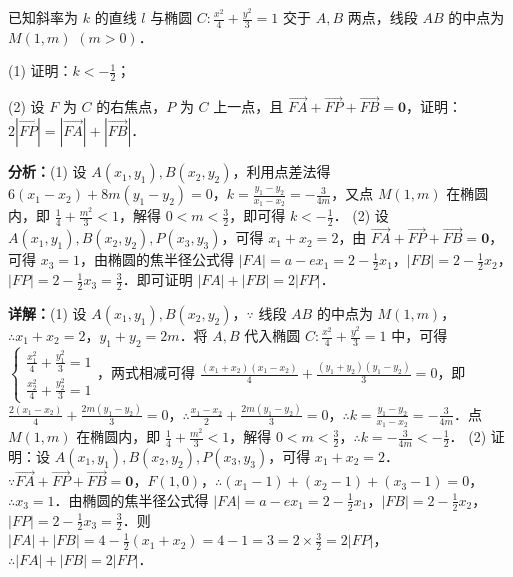 \begin{question}[points=12]
已知斜率为 $k$ 的直线 $l$ 与椭圆 $C: \frac{x^2}{4}+\frac{y^2}{3}=1$ 交于 $A,B$ 两点，线段 $AB$ 的中点为 $M(1,m)$ $(m>0)$．

(1) 证明：$k<-\frac{1}{2}$；

(2) 设 $F$ 为 $C$ 的右焦点，$P$ 为 $C$ 上一点，且 $\overrightarrow{FA}+\overrightarrow{FP}+\overrightarrow{FB}=\boldsymbol{0}$，证明：$2|\overrightarrow{FP}|=|\overrightarrow{FA}|+|\overrightarrow{FB}|$．
\begin{solution}

\textbf{分析：}(1) 设 $A(x_1,y_1),B(x_2,y_2)$，利用点差法得 $6(x_1-x_2)+8m(y_1-y_2)=0$，$k=\frac{y_1-y_2}{x_1-x_2}=-\frac{3}{4m}$，又点 $M(1,m)$ 在椭圆内，即 $\frac{1}{4}+\frac{m^2}{3}<1$，解得 $0<m<\frac{3}{2}$，即可得 $k<-\frac{1}{2}$．
(2) 设 $A(x_1,y_1),B(x_2,y_2),P(x_3,y_3)$，可得 $x_1+x_2=2$，由 $\overrightarrow{FA}+\overrightarrow{FP}+\overrightarrow{FB}=\boldsymbol{0}$，可得 $x_3=1$，由椭圆的焦半径公式得 $|FA|=a-ex_1=2-\frac{1}{2}x_1$，$|FB|=2-\frac{1}{2}x_2$，$|FP|=2-\frac{1}{2}x_3=\frac{3}{2}$．即可证明 $|FA|+|FB|=2|FP|$．

\textbf{详解：}(1) 设 $A(x_1,y_1),B(x_2,y_2)$，$\because$ 线段 $AB$ 的中点为 $M(1,m)$，$\therefore x_1+x_2=2$，$y_1+y_2=2m$．将 $A,B$ 代入椭圆 $C: \frac{x^2}{4}+\frac{y^2}{3}=1$ 中，可得 $\begin{cases} \frac{x_1^2}{4}+\frac{y_1^2}{3}=1 \\ \frac{x_2^2}{4}+\frac{y_2^2}{3}=1 \end{cases}$，两式相减可得 $\frac{(x_1+x_2)(x_1-x_2)}{4}+\frac{(y_1+y_2)(y_1-y_2)}{3}=0$，即 $\frac{2(x_1-x_2)}{4}+\frac{2m(y_1-y_2)}{3}=0$，$\therefore \frac{x_1-x_2}{2}+\frac{2m(y_1-y_2)}{3}=0$，$\therefore k=\frac{y_1-y_2}{x_1-x_2}=-\frac{3}{4m}$．点 $M(1,m)$ 在椭圆内，即 $\frac{1}{4}+\frac{m^2}{3}<1$，解得 $0<m<\frac{3}{2}$，$\therefore k=-\frac{3}{4m}<-\frac{1}{2}$．
(2) 证明：设 $A(x_1,y_1),B(x_2,y_2),P(x_3,y_3)$，可得 $x_1+x_2=2$．$\because \overrightarrow{FA}+\overrightarrow{FP}+\overrightarrow{FB}=\boldsymbol{0}$，$F(1,0)$，$\therefore (x_1-1)+(x_2-1)+(x_3-1)=0$，$\therefore x_3=1$．由椭圆的焦半径公式得 $|FA|=a-ex_1=2-\frac{1}{2}x_1$，$|FB|=2-\frac{1}{2}x_2$，$|FP|=2-\frac{1}{2}x_3=\frac{3}{2}$．则 $|FA|+|FB|=4-\frac{1}{2}(x_1+x_2)=4-1=3=2\times\frac{3}{2}=2|FP|$，$\therefore |FA|+|FB|=2|FP|$．
\end{solution}
\end{question}

